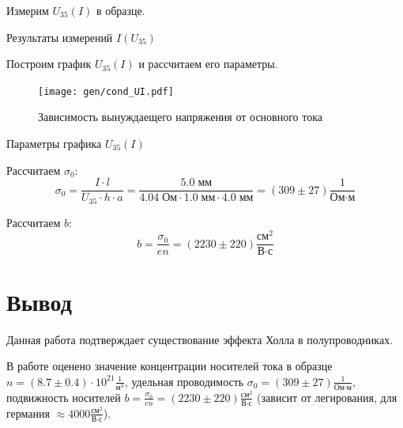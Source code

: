 \documentclass[12pt,a4paper]{article}
\begin{document}
	Измерим $U_{35} (I)$ в образце.
	
	\begin{table}[h]
		\caption{Результаты измерений $I(U_{35})$}
		
	\end{table}
	
	Построим график $U_{35} (I)$ и рассчитаем его параметры.
	
	\begin{figure}[H]
		\texttt{[image: gen/cond\_UI.pdf]}
		\caption{Зависимость вынуждаещего напряжения от основного тока}
	\end{figure}
	
	\begin{table}[h]
		\caption{Параметры графика $U_{35} (I)$}
		
	\end{table}
	
	Рассчитаем $\sigma_0$:
	$$ \sigma_0 = \frac{I \cdot l}{U_{35} \cdot h \cdot a} = \frac{ 5.0 \; \text{мм} }{ 4.04 \; \text{Ом} \cdot 1.0 \; \text{мм} \cdot 4.0 \; \text{мм}} = (309 \pm 27) \frac{1}{\text{Ом} \cdot \text{м}} $$
	
	Рассчитаем $b$:
	$$ b = \frac{\sigma_0}{e n} = (2230 \pm 220) \frac{\text{см}^2}{\text{В} \cdot \text{с}} $$
	
	\section*{Вывод}
	
	Данная работа подтверждает существование эффекта Холла в полупроводниках.
	
	В работе оценено значение концентрации носителей тока в образце $ n = (8.7 \pm 0.4) \cdot 10^{21} \frac{1}{\text{м}^3} $, удельная проводимость $ \sigma_0 = (309 \pm 27) \frac{1}{\text{Ом} \cdot \text{м}} $, подвижность носителей $ b = \frac{\sigma_0}{e n} = (2230 \pm 220) \frac{\text{см}^2}{\text{В} \cdot \text{с}} $ (зависит от легирования, для германия $\approx 4000 \frac{\text{см}^2}{\text{В} \cdot \text{с}}$). 
	
\end{document}
